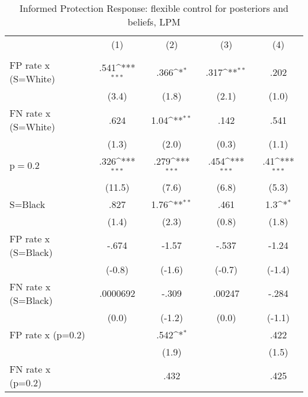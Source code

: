 \begin{table}[htbp]\centering
\def\sym#1{\ifmmode^{#1}\else\(^{#1}\)\fi}
\caption{Informed Protection Response: flexible control for posteriors and beliefs, LPM}
\begin{tabular}{l*{4}{c}}
\hline\hline
                &\multicolumn{1}{c}{(1)}&\multicolumn{1}{c}{(2)}&\multicolumn{1}{c}{(3)}&\multicolumn{1}{c}{(4)}\\
                &\multicolumn{1}{c}{}&\multicolumn{1}{c}{}&\multicolumn{1}{c}{}&\multicolumn{1}{c}{}\\
\hline
FP rate x (S=White)&     .541\sym{***}&     .366\sym{*}  &     .317\sym{**} &     .202         \\
                &    (3.4)         &    (1.8)         &    (2.1)         &    (1.0)         \\
FN rate x (S=White)&     .624         &     1.04\sym{**} &     .142         &     .541         \\
                &    (1.3)         &    (2.0)         &    (0.3)         &    (1.1)         \\
p$=$0.2         &     .326\sym{***}&     .279\sym{***}&     .454\sym{***}&      .41\sym{***}\\
                &   (11.5)         &    (7.6)         &    (6.8)         &    (5.3)         \\
S=Black         &     .827         &     1.76\sym{**} &     .461         &      1.3\sym{*}  \\
                &    (1.4)         &    (2.3)         &    (0.8)         &    (1.8)         \\
FP rate x (S=Black)&    -.674         &    -1.57         &    -.537         &    -1.24         \\
                &   (-0.8)         &   (-1.6)         &   (-0.7)         &   (-1.4)         \\
FN rate x (S=Black)& .0000692         &    -.309         &   .00247         &    -.284         \\
                &    (0.0)         &   (-1.2)         &    (0.0)         &   (-1.1)         \\
FP rate x (p=0.2)&                  &     .542\sym{*}  &                  &     .422         \\
                &                  &    (1.9)         &                  &    (1.5)         \\
FN rate x (p=0.2)&                  &     .432         &                  &     .425         \\

\end{tabular}
\end{table}
